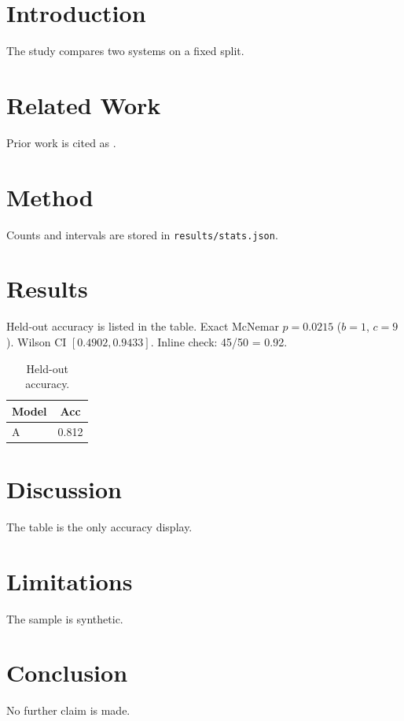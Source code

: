 \documentclass{article}
\begin{document}
\begin{abstract}
Synthetic submission used only as a mechanical-check fixture.
\end{abstract}
\section{Introduction}
The study compares two systems on a fixed split.
\section{Related Work}
Prior work is cited as \cite{vaswani2017}.
\section{Method}
Counts and intervals are stored in \texttt{results/stats.json}.

\section{Results}
Held-out accuracy is listed in the table.
Exact McNemar $p=0.0215$ ($b=1$, $c=9$).
Wilson CI $[0.4902, 0.9433]$.
Inline check: 45/50 = 0.92.

\begin{table}
\caption{Held-out accuracy.}
\label{tab:acc}
\begin{tabular}{lc}
\toprule
Model & Acc \\
\midrule
A & 0.812 \\
\bottomrule
\end{tabular}
\end{table}
\section{Discussion}
The table is the only accuracy display.
\section{Limitations}
The sample is synthetic.
\section{Conclusion}
No further claim is made.
\end{document}
